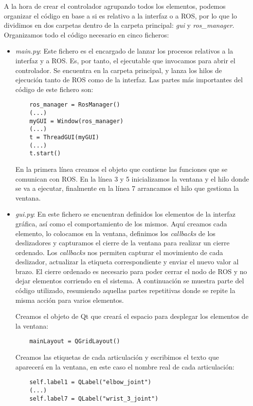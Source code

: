 A la hora de crear el controlador agrupando todos los elementos, podemos organizar el código en base a si es relativo a la interfaz o a ROS, por lo que lo dividimos en dos carpetas dentro de la carpeta principal: \textit{gui} y \textit{ros\_manager}. Organizamos todo el código necesario en cinco ficheros:
\begin{itemize}
	\item \textit{main.py}: Este fichero es el encargado de lanzar los procesos relativos a la interfaz y a ROS. Es, por tanto, el ejecutable que invocamos para abrir el controlador. Se encuentra en la carpeta principal, y lanza los hilos de ejecución tanto de ROS como de la interfaz. Las partes más importantes del código de este fichero son:
	\lstset{language=Python}
	\begin{lstlisting}
	ros_manager = RosManager()
	(...)
	myGUI = Window(ros_manager)
	(...)
	t = ThreadGUI(myGUI)
	(...)
	t.start()
	\end{lstlisting}
	
	En la primera línea creamos el objeto que contiene las funciones que se comunican con ROS. En la línea 3 y 5 inicializamos la ventana y el hilo donde se va a ejecutar, finalmente en la línea 7 arrancamos el hilo que gestiona la ventana. 
	
	\item \textit{gui.py}: En este fichero se encuentran definidos los elementos de la interfaz gráfica, así como el comportamiento de los mismos. Aquí creamos cada elemento, lo colocamos en la ventana, definimos los \textit{callbacks} de los deslizadores y capturamos el cierre de la ventana para realizar un cierre ordenado. Los \textit{callbacks} nos permiten capturar el movimiento de cada deslizador, actualizar la etiqueta correspondiente y enviar el nuevo valor al brazo. El cierre ordenado es necesario para poder cerrar el nodo de ROS y no dejar elementos corriendo en el sistema. A continuación se muestra parte del código utilizado, resumiendo aquellas partes repetitivas donde se repite la misma acción para varios elementos.
	
	Creamos el objeto de Qt que creará el espacio para desplegar los elementos de la ventana:
	\begin{lstlisting}
	mainLayout = QGridLayout()
	\end{lstlisting}
	
	Creamos las etiquetas de cada articulación y escribimos el texto que aparecerá en la ventana, en este caso el nombre real de cada articulación:
	\begin{lstlisting}
	self.label1 = QLabel("elbow_joint")
	(...)
	self.label7 = QLabel("wrist_3_joint")
	\end{lstlisting}
	

\end{itemize}
